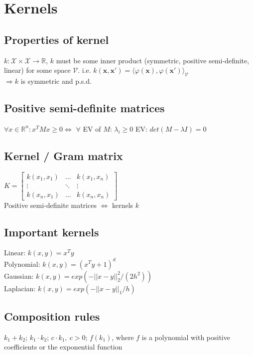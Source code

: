 \section*{Kernels}

\subsection*{Properties of kernel}
$k: \mathcal{X} \times \mathcal{X} \rightarrow \mathbb{R}$, $k$ must be some inner product (symmetric, positive semi-definite, linear) for some space $\mathcal{V}$.
i.e. $k(\mathbf{x}, \mathbf{x'}) = \langle \varphi(\mathbf{x}), \varphi(\mathbf{x'}) \rangle_\mathcal{V}$\\
$\Rightarrow k$ is symmetric and p.s.d. 

\subsection*{Positive semi-definite matrices}
$\forall x \in \mathbb{R}^n: x^TMx \geq 0 \Leftrightarrow$
$\forall$ EV of $M$: $\lambda_i\geq 0$
EV: $det(M - \lambda I) = 0$

\subsection*{Kernel / Gram matrix}
$K = 
\begin{bmatrix}
	k(x_1,x_1) & \dots & k(x_1,x_n) \\
	\vdots & \ddots & \vdots \\
	k(x_n, x_1) & \dots & k(x_n,x_n)
\end{bmatrix}$\\
Positive semi-definite matrices $\Leftrightarrow$ kernels $k$

\subsection*{Important kernels}
Linear: $k(x,y)=x^T y$\\
Polynomial: $k(x,y)=(x^T y + 1)^d$\\
Gaussian: $k(x,y) = exp(-||x-y||_2^2/(2h^2))$\\
Laplacian: $k(x,y) = exp(-||x-y||_1/h)$

\subsection*{Composition rules}
$k_1 + k_2$; $k_1 \cdot k_2$; $c \cdot k_1,\ c > 0$; $f(k_1)$, where $f$ is a polynomial with positive coefficients or the exponential function

